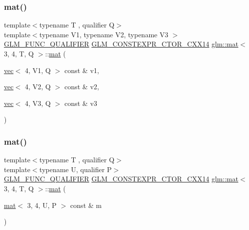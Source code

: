 \subsubsection{\texorpdfstring{mat()}{mat()}\hspace{0.1cm}{\footnotesize\ttfamily [20/21]}}
{\footnotesize\ttfamily template$<$typename T , qualifier Q$>$ \\
template$<$typename V1, typename V2, typename V3 $>$ \\
\mbox{\hyperlink{setup_8hpp_a33fdea6f91c5f834105f7415e2a64407}{G\+L\+M\+\_\+\+F\+U\+N\+C\+\_\+\+Q\+U\+A\+L\+I\+F\+I\+ER}} \mbox{\hyperlink{setup_8hpp_a0900f9145e68bf6061b6f5e7be3fa751}{G\+L\+M\+\_\+\+C\+O\+N\+S\+T\+E\+X\+P\+R\+\_\+\+C\+T\+O\+R\+\_\+\+C\+X\+X14}} \mbox{\hyperlink{structglm_1_1mat}{glm\+::mat}}$<$ 3, 4, T, Q $>$\+::\mbox{\hyperlink{structglm_1_1mat}{mat}} (\begin{DoxyParamCaption}\item[{\mbox{\hyperlink{structglm_1_1vec}{vec}}$<$ 4, V1, Q $>$ const \&}]{v1,  }\item[{\mbox{\hyperlink{structglm_1_1vec}{vec}}$<$ 4, V2, Q $>$ const \&}]{v2,  }\item[{\mbox{\hyperlink{structglm_1_1vec}{vec}}$<$ 4, V3, Q $>$ const \&}]{v3 }\end{DoxyParamCaption})}

\mbox{\label{structglm_1_1mat_3_013_00_014_00_01_t_00_01_q_01_4_a3cecec80a6625a5cccb51d98f04d96a4}} 
\subsubsection{\texorpdfstring{mat()}{mat()}\hspace{0.1cm}{\footnotesize\ttfamily [21/21]}}
{\footnotesize\ttfamily template$<$typename T , qualifier Q$>$ \\
template$<$typename U, qualifier P$>$ \\
\mbox{\hyperlink{setup_8hpp_a33fdea6f91c5f834105f7415e2a64407}{G\+L\+M\+\_\+\+F\+U\+N\+C\+\_\+\+Q\+U\+A\+L\+I\+F\+I\+ER}} \mbox{\hyperlink{setup_8hpp_a0900f9145e68bf6061b6f5e7be3fa751}{G\+L\+M\+\_\+\+C\+O\+N\+S\+T\+E\+X\+P\+R\+\_\+\+C\+T\+O\+R\+\_\+\+C\+X\+X14}} \mbox{\hyperlink{structglm_1_1mat}{glm\+::mat}}$<$ 3, 4, T, Q $>$\+::\mbox{\hyperlink{structglm_1_1mat}{mat}} (\begin{DoxyParamCaption}\item[{\mbox{\hyperlink{structglm_1_1mat}{mat}}$<$ 3, 4, U, P $>$ const \&}]{m }\end{DoxyParamCaption})}



